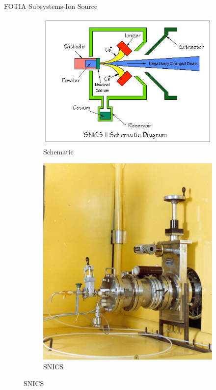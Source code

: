 \documentclass[11pt]{beamer}
\begin{document}
\begin{frame}{FOTIA Subsystems-Ion Source}

   \begin{figure}
        \centering
        \begin{subfigure}[b]{0.25\textwidth}
                \includegraphics[width=\textwidth]{small_snics_schematic.jpg}
                \caption{Schematic}
                \label{fig:Schematic}
        \end{subfigure}%
        \begin{subfigure}[b]{0.2\textwidth}
                \includegraphics[width=\textwidth]{SNICS.jpg}
                \caption{SNICS}
                \label{fig:SNICS Source}
        \end{subfigure}%
        \end{figure}
   

\end{frame}
\end{document}
